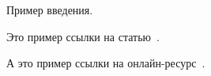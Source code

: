 Пример введения.

Это пример ссылки на статью~\cite{shelekhov1999data}.

А это пример ссылки на онлайн-ресурс~\cite{cwe703}.
